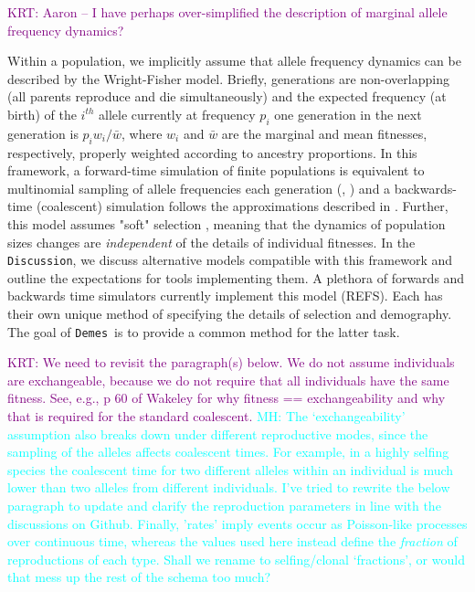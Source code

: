 \documentclass[11pt]{article}
\newcommand{\Demes}[0]{\texttt{Demes}}
\newcommand{\krtcomment}[1]{{\textcolor{purple}{KRT: #1}}}
\newcommand{\mhcomment}[1]{{\textcolor{cyan}{MH: #1}}}
\begin{document}
\krtcomment{Aaron -- I have perhaps over-simplified the description of marginal allele frequency dynamics?}

Within a population, we implicitly assume that allele frequency dynamics can
be described by the Wright-Fisher model.  Briefly, generations are non-overlapping (all parents
reproduce and die simultaneously) and the expected frequency (at birth) of the $i^{th}$ allele currently at frequency $p_i$
one generation in the next generation is $p_iw_i/\bar{w}$, where $w_i$ and $\bar{w}$ are the marginal and
mean fitnesses, respectively, properly weighted according to ancestry proportions. In this framework,
a forward-time simulation of finite populations is equivalent to multinomial sampling of allele frequencies each
generation (\citet[][pp 29-31]{burger2000-ul}, \citet[][pp 179-181]{crowkimura1970})
and a backwards-time (coalescent) simulation follows the approximations described in \cite[][chapter 3]{wakeley2008-hd}.
Further, this model assumes "soft" selection \citep{christiansen1975hard}, meaning that the dynamics of population sizes
changes are \textit{independent} of the details of individual fitnesses.
In the \texttt{Discussion}, we discuss alternative models compatible with this framework and outline the expectations for tools implementing
them.
A plethora of forwards and backwards time simulators currently implement this model (REFS).
Each has their own unique method of specifying the details of selection and demography.
The goal of \Demes\ is to provide a common method for the latter task.  

\krtcomment{We need to revisit the paragraph(s) below.  We do not assume individuals are exchangeable, because we do not
	require that all individuals have the same fitness. See, e.g., p 60 of Wakeley for why fitness == exchangeability
	and why that is required for the standard coalescent.}
\mhcomment{The `exchangeability' assumption also breaks down under different reproductive modes, since the sampling of the alleles affects coalescent times. For example, in a highly selfing species the coalescent time for two different alleles within an individual is much lower than two alleles from different individuals. I've tried to rewrite the below paragraph to update and clarify the reproduction parameters in line with the discussions on Github. Finally, 'rates' imply events occur as Poisson-like processes over continuous time, whereas the values used here instead define the \emph{fraction} of reproductions of each type. Shall we rename to selfing/clonal `fractions', or would that mess up the rest of the schema too much?}
\end{document}
